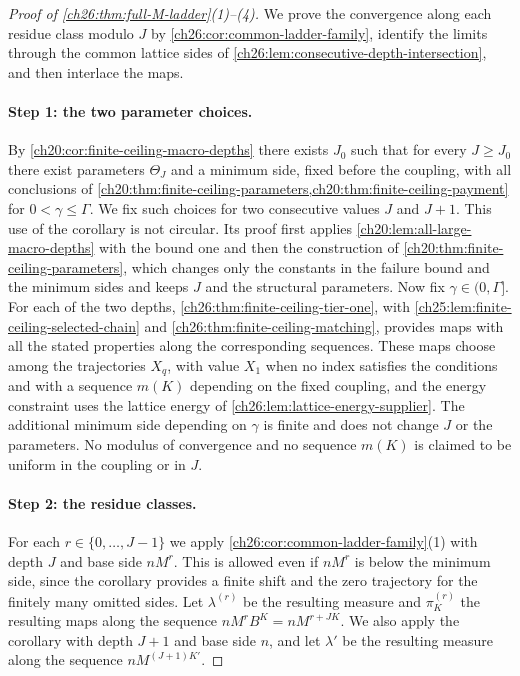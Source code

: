 \begin{proof}[Proof of \cref{ch26:thm:full-M-ladder}(1)--(4)]
We prove the convergence along each residue class modulo $J$ by \cref{ch26:cor:common-ladder-family}, identify the limits through the common lattice sides of \cref{ch26:lem:consecutive-depth-intersection}, and then interlace the maps.

\paragraph{Step 1: the two parameter choices.}
By \cref{ch20:cor:finite-ceiling-macro-depths} there exists $J_0$ such that for every $J\ge J_0$ there exist parameters $\Theta_J$ and a minimum side, fixed before the coupling, with all conclusions of \cref{ch20:thm:finite-ceiling-parameters,ch20:thm:finite-ceiling-payment} for $0<\gamma\le\Gamma$. We fix such choices for two consecutive values $J$ and $J+1$. This use of the corollary is not circular. Its proof first applies \cref{ch20:lem:all-large-macro-depths} with the bound one and then the construction of \cref{ch20:thm:finite-ceiling-parameters}, which changes only the constants in the failure bound and the minimum sides and keeps $J$ and the structural parameters. Now fix $\gamma\in(0,\Gamma]$. For each of the two depths, \cref{ch26:thm:finite-ceiling-tier-one}, with \cref{ch25:lem:finite-ceiling-selected-chain} and \cref{ch26:thm:finite-ceiling-matching}, provides maps with all the stated properties along the corresponding sequences. These maps choose among the trajectories $X_q$, with value $X_1$ when no index satisfies the conditions and with a sequence $m(K)$ depending on the fixed coupling, and the energy constraint uses the lattice energy of \cref{ch26:lem:lattice-energy-supplier}. The additional minimum side depending on $\gamma$ is finite and does not change $J$ or the parameters. No modulus of convergence and no sequence $m(K)$ is claimed to be uniform in the coupling or in $J$.

\paragraph{Step 2: the residue classes.}
For each $r\in\{0,\dots,J-1\}$ we apply \cref{ch26:cor:common-ladder-family}(1) with depth $J$ and base side $nM^r$. This is allowed even if $nM^r$ is below the minimum side, since the corollary provides a finite shift and the zero trajectory for the finitely many omitted sides. Let $\lambda^{(r)}$ be the resulting measure and $\pi^{(r)}_K$ the resulting maps along the sequence $nM^rB^K=nM^{r+JK}$. We also apply the corollary with depth $J+1$ and base side $n$, and let $\lambda'$ be the resulting measure along the sequence $nM^{(J+1)K'}$.


\end{proof}

